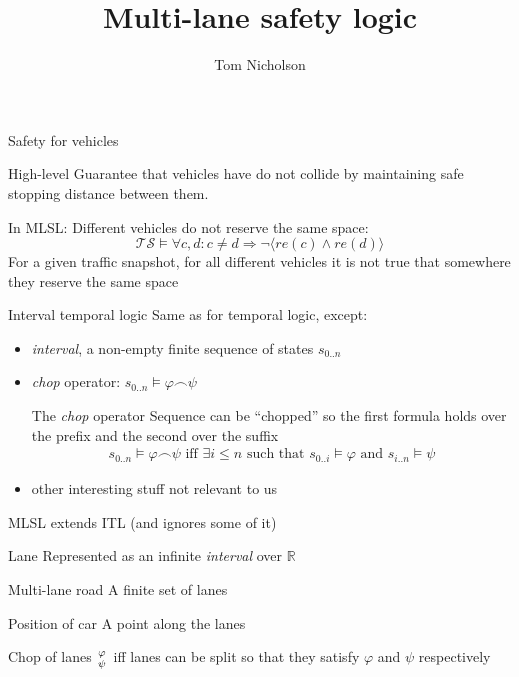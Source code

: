 \documentclass[xcolor=table]{beamer}
\title[Coordinated Autonomous Vehicle Safety]{Multi-lane safety logic}
\author{Tom Nicholson}
\institute{Seoul National University}
\begin{document}
		
	\frame{\titlepage}
	
\begin{frame}{Safety for vehicles}
\begin{block}{High-level}
	Guarantee that vehicles have do not collide by maintaining safe stopping distance between them.
\end{block}
\pause

\begin{block}{In MLSL:}
	Different vehicles do not reserve the same space:
	\pause
	\begin{equation*}
	\mathcal{TS} \models \forall c, d: c \ne d \Rightarrow \neg \langle re(c) \land re(d)\rangle
	\end{equation*}
	For a given traffic snapshot, for all different vehicles it is not true that somewhere they reserve the same space
\end{block}

\end{frame}



\begin{frame}{Interval temporal logic}
Same as for temporal logic, except:

\begin{itemize}
	\item \textit{interval}, a non-empty finite sequence of states $s_{0..n}$
	\pause
	\item \textit{chop} operator: $s_{0..n} \models \varphi \frown \psi$
	\begin{block}{The \textit{chop} operator}
		Sequence can be ``chopped'' so the first formula holds over the prefix and the second over the suffix
		\begin{gather*}
		s_{0..n} \models \varphi \frown \psi \text{  iff  } \exists i \le n \text{   such that    } s_{0..i} \models \varphi \text{ and } s_{i..n} \models \psi
		\end{gather*}
		
	\end{block}
	\pause
	\item other interesting stuff not relevant to us
\end{itemize}

\end{frame}  

\begin{frame}{MLSL extends ITL (and ignores some of it)}

\begin{block}{Lane}
	Represented as an infinite \textit{interval} over $\mathbb{R}$
\end{block}
\pause
\begin{block}{Multi-lane road}
	A finite set of lanes
\end{block}
\pause
\begin{block}{Position of car}
	A point along the lanes
\end{block}
\pause
\begin{block}{Chop of lanes}
	$\varphi \atop \psi$ iff lanes can be split so that they satisfy $\varphi$ and $\psi$ respectively
\end{block}


\end{frame}
\end{document}
